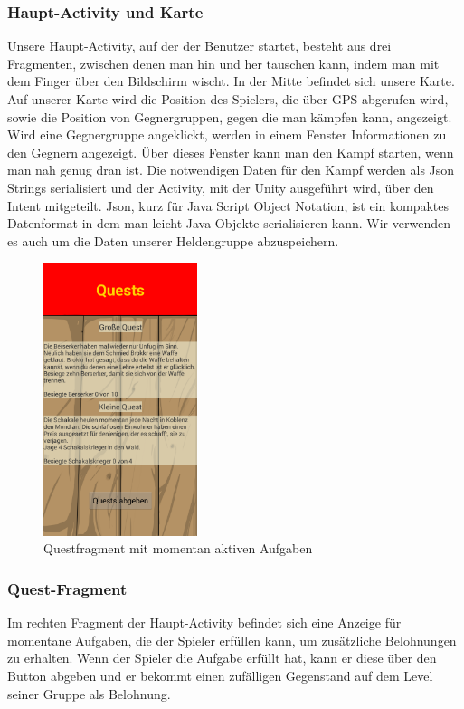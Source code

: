 \documentclass[extern,palatino]{cgBA}
\begin{document}
\subsubsection{Haupt-Activity und Karte}Unsere Haupt-Activity, auf der der Benutzer startet, besteht aus drei Fragmenten, zwischen denen man hin und her tauschen kann, indem man mit dem Finger über den Bildschirm wischt. In der Mitte befindet sich unsere Karte. Auf unserer Karte wird die Position des Spielers, die über GPS abgerufen wird, sowie die Position von Gegnergruppen, gegen die man kämpfen kann, angezeigt. Wird eine Gegnergruppe angeklickt, werden in einem Fenster Informationen zu den Gegnern angezeigt. Über dieses Fenster kann man den Kampf starten, wenn man nah genug dran ist. Die notwendigen Daten für den Kampf werden als Json Strings serialisiert und der Activity, mit der Unity ausgeführt wird, über den Intent mitgeteilt. Json, kurz für Java Script Object Notation, ist ein kompaktes Datenformat in dem man leicht Java Objekte serialisieren kann. Wir verwenden es auch um die Daten unserer Heldengruppe abzuspeichern.
	
\newpage
\begin{figure}[H] 
		\centering
		\includegraphics[width=0.4\textwidth]{questfragment.png}
		\caption{Questfragment mit momentan aktiven Aufgaben}
		\label{fig:Bild3}
\end{figure}
\subsubsection{Quest-Fragment}
Im rechten Fragment der Haupt-Activity befindet sich eine Anzeige für momentane Aufgaben, die der Spieler erfüllen kann, um zusätzliche Belohnungen zu erhalten. Wenn der Spieler die Aufgabe erfüllt hat, kann er diese über den Button abgeben und er bekommt einen zufälligen Gegenstand auf dem Level seiner Gruppe als Belohnung.
	
\end{document}
